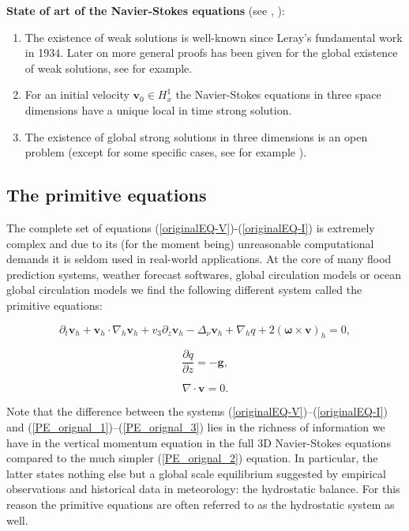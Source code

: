 \documentclass[12pt]{report}
\numberwithin{theorem}{chapter}
\numberwithin{corollary}{chapter}
\numberwithin{lemma}{chapter}
\numberwithin{remark}{chapter}
\numberwithin{definition}{chapter}
\numberwithin{prop}{chapter}
\begin{document}
\bigskip

\textbf{State of art of the Navier-Stokes equations} (see \cite{constantin1988navier}, \cite{temam2001navier}):
\begin{enumerate}[label=\arabic*)]
  \item The existence of weak solutions is well-known since Leray's fundamental work \cite{leray1934mouvement} in 1934. Later on more general proofs has been given for the global existence of weak solutions, see \cite{temam2001navier} for example.
  \item For an initial velocity $\mathbf{v}_0 \in H^1_x$ the Navier-Stokes equations in three space dimensions have a unique local in time strong solution.
  \item The existence of global strong solutions in three dimensions is an open problem (except for some specific cases, see for example \cite{li2019primitive}).
\end{enumerate}

\subsection{The primitive equations}\label{PEsgeneraldescription}

The complete set of equations (\ref{originalEQ-V})-(\ref{originalEQ-I}) is extremely complex and due to its (for the moment being) unreasonable computational demands it is seldom used in real-world applications. At the core of many flood prediction systems, weather forecast softwares, global circulation models or ocean global circulation models we find the following different system called the primitive equations:

\begin{equation} \label{PE_orignal_1} \partial_t \mathbf{v}_h + \mathbf{v}_h \cdot \nabla_h \mathbf{v}_h + v_3 \partial_z \mathbf{v}_h - \Delta_{\nu} \mathbf{v}_h + \nabla_h q + 2 (\mathbf{\omega} \times \mathbf{v})_h = 0, \end{equation}

\begin{equation} \label{PE_orignal_2} \frac{\partial q}{\partial z} = - \mathbf{g}, \end{equation}

\begin{equation} \label{PE_orignal_3} \nabla \cdot \mathbf{v} = 0. \end{equation}

Note that the difference between the systems (\ref{originalEQ-V})--(\ref{originalEQ-I}) and (\ref{PE_orignal_1})--(\ref{PE_orignal_3}) lies in the richness of information we have in the vertical momentum equation in the full 3D Navier-Stokes equations compared to the much simpler (\ref{PE_orignal_2}) equation. In particular, the latter states nothing else but a global scale equilibrium suggested by empirical observations and historical data in meteorology: the hydrostatic balance. For this reason the primitive equations are often referred to as the hydrostatic system as well. 
\end{document}
